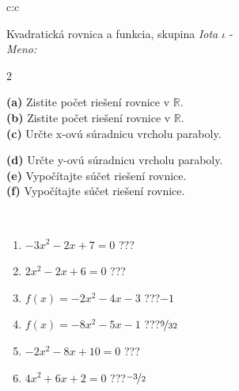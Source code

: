 \documentclass[10pt]{report}
\begin{document}
\begin{tabular}{c:c}
\begin{minipage}[c][104.5mm][t]{0.5\linewidth}
\begin{center}
\vspace{7mm}
{\huge {\LARGE Kvadratická rovnica a funkcia}, skupina \textit{Iota $\iota$} -}\\[5mm]
\textit{Meno:}\phantom{xxxxxxxxxxxxxxxxxxxxxxxxxxxxxxxxxxxxxxxxxxxxxxxxxxxxxxxxxxxxxxxxx}\\[5mm]
\begin{minipage}{0.95\linewidth}
\begin{center}
{\small \begin{multicols}{2} \raggedright
\textbf{(a)} Zistite počet riešení rovnice v \(\mathbb{R}\). \\[1mm]
\textbf{(b)} Zistite počet riešení rovnice v \(\mathbb{R}\). \\[1mm]
\textbf{(c)} Určte x-ovú súradnicu vrcholu paraboly. \par \columnbreak
\textbf{(d)} Určte y-ovú súradnicu vrcholu paraboly. \\[1mm]
\textbf{(e)} Vypočítajte súčet riešení rovnice. \\[1mm]
\textbf{(f)} Vypočítajte súčet riešení rovnice.
\end{multicols}
}
\end{center}
\end{minipage}
\\[4mm]
\begin{minipage}{0.79\linewidth}
\begin{center}
\begin{varwidth}{\linewidth}
\begin{enumerate}
\Large
\item $-3x^2-2x+7=0$\quad \dotfill\; ???\;\dotfill {}
\item $2x^2-2x+6=0$\quad \dotfill\; ???\;\dotfill {}
\item $f(x)=-2x^2-4x-3$\quad \dotfill\; ???\;\dotfill \quad $-1$
\item $f(x)=-8x^2-5x-1$\quad \dotfill\; ???\;\dotfill \quad $\nicefrac{9}{32}$
\item $-2x^2-8x+10=0$\quad \dotfill\; ???\;\dotfill {}
\item $4x^2+6x+2=0$\quad \dotfill\; ???\;\dotfill \quad $\nicefrac{-3}{2}$
\end{enumerate}
\end{varwidth}
\end{center}
\end{minipage}

\end{center}
\end{minipage}
\end{tabular}
\end{document}
